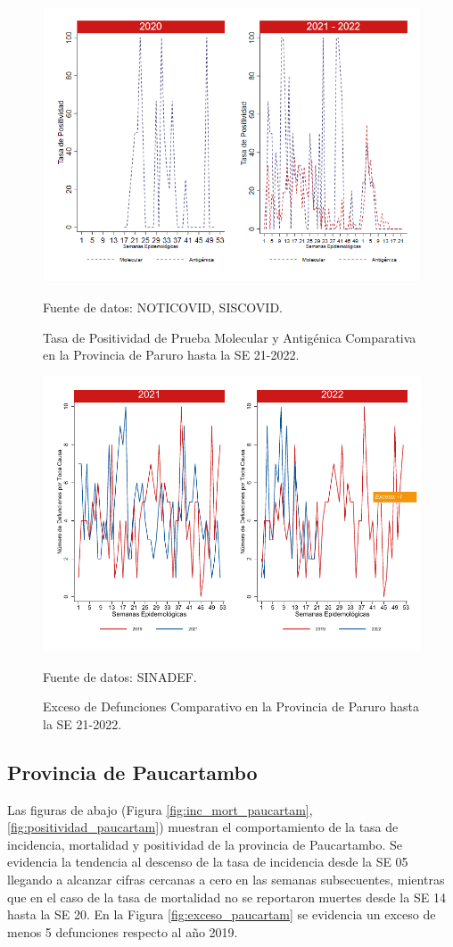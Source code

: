 \documentclass[12pt,a4paper,openany]{book}
\begin{document}
	\begin{figure}[h]
		\caption{Tasa de Positividad de Prueba Molecular y Antigénica Comparativa en la Provincia de Paruro hasta la SE 21-2022.}\label{fig:positividad_paruro}
		\begin{center}
			\includegraphics[width=0.7\linewidth]{../figuras/positividad_20_21_10.png}
		\end{center}
		{\footnotesize {Fuente de datos: NOTICOVID, SISCOVID.}}
	\end{figure}
	
	\begin{figure}[h]
		\caption{Exceso de Defunciones Comparativo en la Provincia de Paruro hasta la SE 21-2022.}\label{fig:exceso_paruro}
		\begin{center}
			\includegraphics[width=0.7\linewidth]{../figuras/exceso_10.pdf}
		\end{center}
		{\footnotesize {Fuente de datos: SINADEF.}}
	\end{figure}
	
	
	\clearpage
	
	\subsection*{Provincia de Paucartambo}
	\noindent Las figuras de abajo (Figura \ref{fig:inc_mort_paucartam}, \ref{fig:positividad_paucartam}) muestran el comportamiento de la tasa de incidencia, mortalidad y positividad de la provincia de Paucartambo. Se evidencia la tendencia al descenso de la tasa de incidencia desde la SE 05 llegando a alcanzar cifras cercanas a cero en las semanas subsecuentes, mientras que en el caso de la tasa de mortalidad no se reportaron muertes desde la SE 14 hasta la SE 20.   
	En la Figura \ref{fig:exceso_paucartam} se evidencia un exceso de menos 5 defunciones respecto al año 2019.  
	
\end{document}
